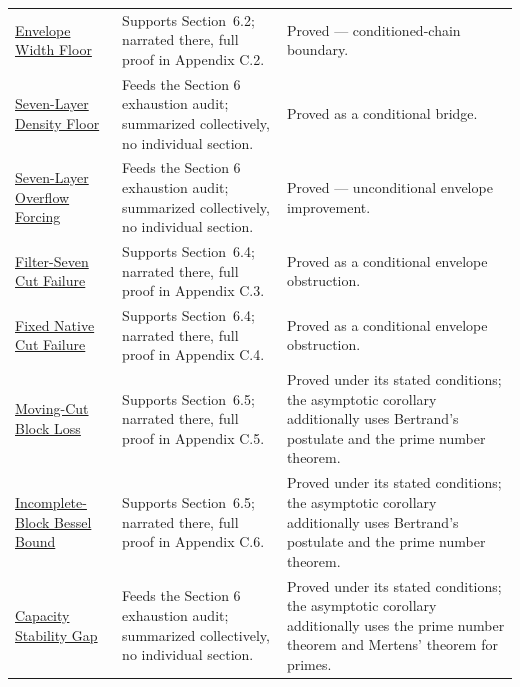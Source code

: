 {\begin{longtable}{>{\raggedright\arraybackslash}p{}>{\raggedright\arraybackslash}p{}>{\raggedright\arraybackslash}p{}}
\href{https://github.com/thiagomata/prime-numbers/blob/master/properties/sieve-sequence/capacity-envelope-width-floor-needs-population-slack.md}{Envelope Width Floor} & Supports Section~6.2; narrated there, full proof in Appendix C.2. & Proved --- conditioned-chain boundary.\\
\href{https://github.com/thiagomata/prime-numbers/blob/master/properties/sieve-sequence/seven-layer-density-floor-maximizes-capacity-width.md}{Seven-Layer Density Floor} & Feeds the Section 6 exhaustion audit; summarized collectively, no individual section. & Proved as a conditional bridge.\\
\href{https://github.com/thiagomata/prime-numbers/blob/master/properties/sieve-sequence/seven-layer-floor-forces-native-overflow.md}{Seven-Layer Overflow Forcing} & Feeds the Section 6 exhaustion audit; summarized collectively, no individual section. & Proved --- unconditional envelope improvement.\\
\href{https://github.com/thiagomata/prime-numbers/blob/master/properties/sieve-sequence/fixed-seven-cut-cannot-clear-original-threshold.md}{Filter-Seven Cut Failure} & Supports Section~6.4; narrated there, full proof in Appendix C.3. & Proved as a conditional envelope obstruction.\\
\href{https://github.com/thiagomata/prime-numbers/blob/master/properties/sieve-sequence/every-fixed-native-cut-fails-original-threshold.md}{Fixed Native Cut Failure} & Supports Section~6.4; narrated there, full proof in Appendix C.4. & Proved as a conditional envelope obstruction.\\
\href{https://github.com/thiagomata/prime-numbers/blob/master/properties/sieve-sequence/moving-cut-loses-complete-native-blocks.md}{Moving-Cut Block Loss} & Supports Section~6.5; narrated there, full proof in Appendix C.5. & Proved under its stated conditions; the asymptotic corollary additionally uses Bertrand's postulate and the prime number theorem.\\
\href{https://github.com/thiagomata/prime-numbers/blob/master/properties/sieve-sequence/incomplete-block-bessel-excludes-no-capacity.md}{Incomplete-Block Bessel Bound} & Supports Section~6.5; narrated there, full proof in Appendix C.6. & Proved under its stated conditions; the asymptotic corollary additionally uses Bertrand's postulate and the prime number theorem.\\
\href{https://github.com/thiagomata/prime-numbers/blob/master/properties/sieve-sequence/capacity-stability-gap-cannot-rescue-capacity-envelope.md}{Capacity Stability Gap} & Feeds the Section 6 exhaustion audit; summarized collectively, no individual section. & Proved under its stated conditions; the asymptotic corollary additionally uses the prime number theorem and Mertens' theorem for primes.\\

\end{longtable}}
